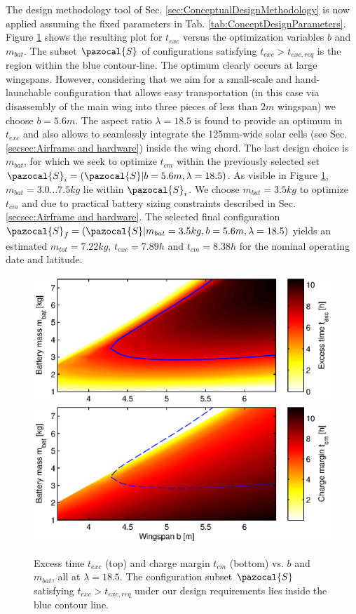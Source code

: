 The design methodology tool of Sec. \ref{sec:ConceptualDesignMethodology} is now applied assuming the fixed parameters in Tab. \ref{tab:ConceptDesignParameters}. Figure \ref{fig:ExcessTimeChargeMargin} shows the resulting plot for $t_{exc}$ versus the optimization variables $b$ and $m_{bat}$. The subset $\pazocal{S}$ of configurations satisfying $t_{exc}>t_{exc,req}$ is the region within the blue contour-line. The optimum clearly occurs at large wingspans. However, considering that we aim for a small-scale and hand-launchable configuration that allows easy transportation (in this case via disassembly of the main wing into three pieces of less than $2m$ wingspan) we choose $b=5.6m$.  The aspect ratio $\lambda=18.5$ is found to provide an optimum in $t_{exc}$ and also allows to seamlessly integrate the 125mm-wide solar cells (see Sec. \ref{secsec:Airframe and hardware}) inside the wing chord. The last design choice is $m_{bat}$, for which we seek to optimize $t_{cm}$ within the previously selected set $\pazocal{S}_i=(\pazocal{S}|b=5.6m, \lambda=18.5)$. As visible in Figure \ref{fig:ExcessTimeChargeMargin}, $m_{bat}=3.0...7.5kg$ lie within $\pazocal{S}_i$. We choose $m_{bat}=3.5kg$ to optimize $t_{cm}$ and due to practical battery sizing constraints described in Sec. \ref{secsec:Airframe and hardware}. The selected final configuration $\pazocal{S}_f=(\pazocal{S}|m_{bat}=3.5kg, b=5.6m, \lambda=18.5)$ yields an estimated $m_{tot}=7.22kg$, $t_{exc}=7.89h$ and $t_{cm}=8.38h$ for the nominal operating date and latitude.
\begin{figure}[tb]
    \centering
    \includegraphics[width=\linewidth]{images/3_excesstime}
    \includegraphics[width=\linewidth]{images/4_chargemargin}
    \caption{Excess time $t_{exc}$ (top) and charge margin $t_{cm}$ (bottom) vs. $b$ and $m_{bat}$, all at $\lambda=18.5$. The configuration subset $\pazocal{S}$ satisfying $t_{exc}>t_{exc,req}$ under our design requirements lies inside the blue contour line.}
    \label{fig:ExcessTimeChargeMargin}
\end{figure}
